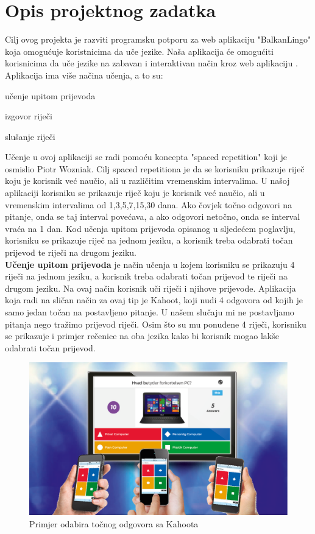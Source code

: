 \chapter{Opis projektnog zadatka}

		Cilj ovog projekta je razviti programsku potporu za web aplikaciju "BalkanLingo" koja omogućuje koristnicima da uče jezike.
		Naša aplikacija će omogućiti korisnicima da uče jezike na zabavan i interaktivan način kroz web aplikaciju .
		Aplikacija ima više načina učenja, a to su: 
		\begin{packed_item}
			\item učenje upitom prijevoda
			\item izgovor riječi
			\item slušanje riječi
		\end{packed_item}

		Učenje u ovoj aplikaciji se radi pomoću koncepta "spaced repetition" koji je osmislio Piotr Wozniak. Cilj spaced repetitiona je da se korisniku prikazuje riječ koju je korisnik već naučio, ali u različitim vremenskim intervalima.
		U našoj aplikaciji korisniku se prikazuje riječ koju je korisnik već naučio, ali u vremenskim intervalima od 1,3,5,7,15,30 dana. Ako čovjek točno odgovori na pitanje, onda se taj interval povećava, a ako odgovori netočno, onda se interval vraća na 1 dan.
		Kod učenja upitom prijevoda opisanog u sljedećem poglavlju, korisniku se prikazuje riječ na jednom jeziku, a korisnik treba odabrati točan prijevod te riječi na drugom jeziku.
		\\

		\textbf{Učenje upitom prijevoda} je način učenja u kojem korisniku se prikazuju 4 riječi na jednom jeziku, a korisnik treba odabrati točan prijevod te riječi na drugom jeziku.
		Na ovaj način korisnik uči riječi i njihove prijevode. Aplikacija koja radi na sličan način za ovaj tip je Kahoot, koji nudi 4 odgovora od kojih je samo jedan točan na postavljeno pitanje. U našem slučaju mi ne postavljamo pitanja nego tražimo prijevod riječi.
		Osim što su mu ponuđene 4 riječi, korisniku se prikazuje i primjer rečenice na oba jezika kako bi korisnik mogao lakše odabrati točan prijevod.
		\begin{figure}[H]
			\centering
			\includegraphics[width=0.8\linewidth]{slike/Kahoot.png}
			\caption{Primjer odabira točnog odgovora sa Kahoota}
			\label{fig:rijecnik}
		\end{figure}
		
